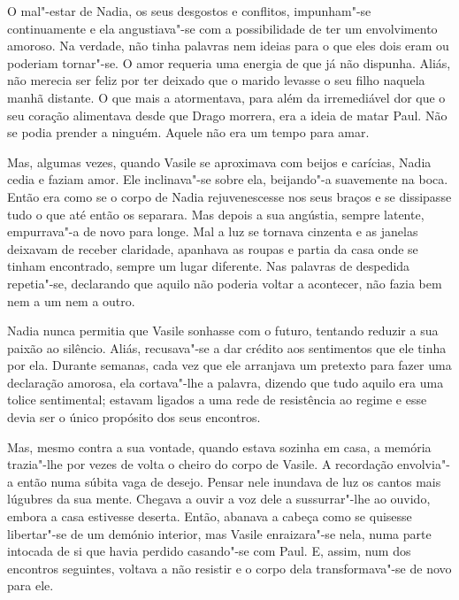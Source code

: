 O mal"-estar de Nadia, os seus desgostos e conflitos, impunham"-se
continuamente e ela angustiava"-se com a possibilidade de ter um
envolvimento amoroso. Na verdade, não tinha palavras nem ideias para o
que eles dois eram ou poderiam tornar"-se. O amor requeria uma energia de
que já não dispunha. Aliás, não merecia ser feliz por ter deixado que o
marido levasse o seu filho naquela manhã distante. O que mais a
atormentava, para além da irremediável dor que o seu coração
alimentava desde que Drago morrera, era a ideia de matar Paul. Não se
podia prender a ninguém. Aquele não era um tempo para amar.

Mas, algumas vezes, quando Vasile se aproximava com beijos e carícias,
Nadia cedia e faziam amor. Ele inclinava"-se sobre ela, beijando"-a suavemente na boca. Então era como se o corpo
de Nadia rejuvenescesse nos seus braços e se dissipasse tudo o que até
então os separara. Mas depois a sua angústia, sempre latente,
empurrava"-a de novo para longe. Mal a luz se tornava cinzenta e as
janelas deixavam de receber claridade, apanhava as roupas e partia da
casa onde se tinham encontrado, sempre um lugar diferente. Nas palavras
de despedida repetia"-se, declarando que aquilo não poderia voltar a
acontecer, não fazia bem nem a um nem a outro.


Nadia nunca permitia que Vasile sonhasse com o futuro, tentando reduzir
a sua paixão ao silêncio. Aliás, recusava"-se a dar crédito aos sentimentos que ele tinha por ela. Durante
semanas, cada vez que ele arranjava um pretexto para fazer uma
declaração amorosa, ela cortava"-lhe a palavra, dizendo que tudo aquilo
era uma tolice sentimental; estavam ligados a uma rede de resistência
ao regime e esse devia ser o único propósito dos seus encontros.

Mas, mesmo contra a sua vontade, quando estava sozinha em casa, a
memória trazia"-lhe por vezes de volta o cheiro do corpo de Vasile. A
recordação envolvia"-a então numa súbita vaga de desejo. Pensar nele
inundava de luz os cantos mais lúgubres da sua mente. Chegava a ouvir a
voz dele a sussurrar"-lhe ao ouvido, embora a casa estivesse deserta.
Então, abanava a cabeça como se quisesse libertar"-se de um demónio interior, mas Vasile enraizara"-se nela, numa parte
intocada de si que havia perdido casando"-se com Paul. E, assim, num dos
encontros seguintes, voltava a não resistir e o corpo dela
transformava"-se de novo para ele.

